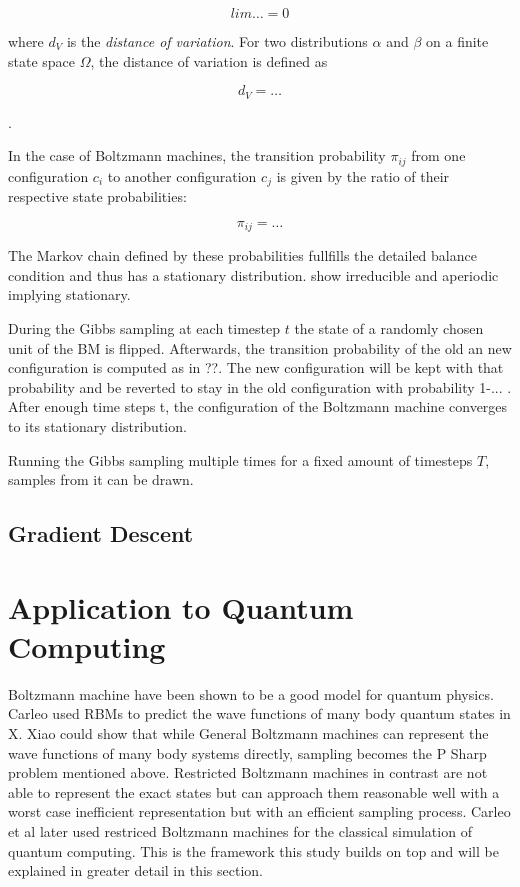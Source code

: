 \begin{equation}
    lim \dots = 0
\end{equation}

where $d_V$ is the \textit{distance of variation}. For two distributions $\alpha$ and $\beta$ on a 
finite state space $\Omega$, the distance of variation is defined as 

\begin{equation}
d_V= \dots
\end{equation}

.

In the case of Boltzmann machines, the transition probability $\pi_{ij}$ from one configuration $c_i$ to another
configuration $c_j$ is given by the ratio of their respective state probabilities:

\begin{equation}
    \pi_{ij} = \dots
\end{equation}

The Markov chain defined by these probabilities fullfills the detailed balance condition and thus 
has a stationary distribution. show irreducible and aperiodic implying stationary.

During the Gibbs sampling at each timestep $t$ the state of a randomly chosen unit of the BM is flipped.
Afterwards, the transition probability of the old an new configuration is computed as in ??. The new 
configuration will be kept with that probability and be reverted to stay in the old configuration with 
probability 1-... . After enough time steps t, the configuration of the Boltzmann machine converges to 
its stationary distribution. 

Running the Gibbs sampling multiple times for a fixed amount of timesteps $T$, samples from it can be 
drawn.

\subsection{Gradient Descent}
\section{Application to Quantum Computing}
\label{sec:applicationToQuantumComputing}
Boltzmann machine have been shown to be a good model for quantum physics. Carleo used RBMs to predict the wave functions 
of many body quantum states in X. Xiao could show that while General Boltzmann machines can represent the wave functions of 
many body systems directly, sampling becomes the P Sharp problem mentioned above. Restricted Boltzmann machines in contrast 
are not able to represent the exact states but can approach them reasonable well with a worst case inefficient representation 
but with an efficient sampling process. Carleo et al later used restriced Boltzmann machines for the classical simulation of 
quantum computing. This is the framework this study builds on top and will be explained in greater detail in this section.

